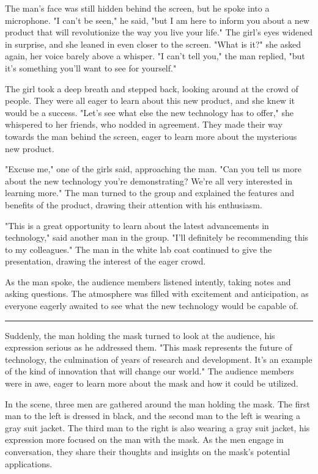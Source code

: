 \documentclass[smalldemyvopaper,11pt,twoside,onecolumn,openright,extrafontsizes]{memoir}
\begin{document}
The man's face was still hidden behind the screen, but he spoke into a microphone. "I can't be seen," he said, "but I am here to inform you about a new product that will revolutionize the way you live your life." The girl's eyes widened in surprise, and she leaned in even closer to the screen. "What is it?" she asked again, her voice barely above a whisper. "I can't tell you," the man replied, "but it's something you'll want to see for yourself."\par
The girl took a deep breath and stepped back, looking around at the crowd of people. They were all eager to learn about this new product, and she knew it would be a success. "Let's see what else the new technology has to offer," she whispered to her friends, who nodded in agreement. They made their way towards the man behind the screen, eager to learn more about the mysterious new product.\par
"Excuse me," one of the girls said, approaching the man. "Can you tell us more about the new technology you're demonstrating? We're all very interested in learning more." The man turned to the group and explained the features and benefits of the product, drawing their attention with his enthusiasm.\par
"This is a great opportunity to learn about the latest advancements in technology," said another man in the group. "I'll definitely be recommending this to my colleagues." The man in the white lab coat continued to give the presentation, drawing the interest of the eager crowd.\par
As the man spoke, the audience members listened intently, taking notes and asking questions. The atmosphere was filled with excitement and anticipation, as everyone eagerly awaited to see what the new technology would be capable of.\par
\fancybreak{* * *}
Suddenly, the man holding the mask turned to look at the audience, his expression serious as he addressed them. "This mask represents the future of technology, the culmination of years of research and development. It's an example of the kind of innovation that will change our world." The audience members were in awe, eager to learn more about the mask and how it could be utilized.\par
In the scene, three men are gathered around the man holding the mask. The first man to the left is dressed in black, and the second man to the left is wearing a gray suit jacket. The third man to the right is also wearing a gray suit jacket, his expression more focused on the man with the mask. As the men engage in conversation, they share their thoughts and insights on the mask's potential applications.\par
\end{document}
